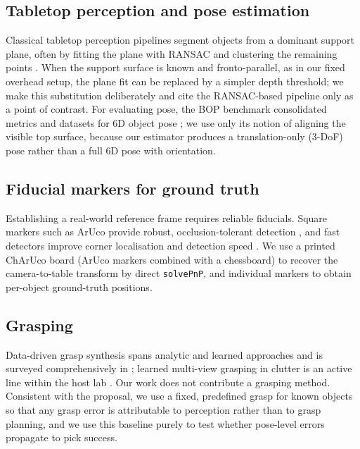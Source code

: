 \subsection{Tabletop perception and pose estimation}
Classical tabletop perception pipelines segment objects from a dominant support plane,
often by fitting the plane with RANSAC and clustering the remaining points
\cite{rusu2008towards}. When the support surface is known and fronto-parallel, as in our
fixed overhead setup, the plane fit can be replaced by a simpler depth threshold; we make
this substitution deliberately and cite the RANSAC-based pipeline only as a point of
contrast. For evaluating pose, the BOP benchmark consolidated metrics and datasets for 6D
object pose \cite{hodan2018bop}; we use only its notion of aligning the visible top
surface, because our estimator produces a translation-only (3-DoF) pose rather than a
full 6D pose with orientation.

\subsection{Fiducial markers for ground truth}
Establishing a real-world reference frame requires reliable fiducials. Square markers such
as ArUco provide robust, occlusion-tolerant detection \cite{garridojurado2014aruco}, and
fast detectors improve corner localisation and detection speed
\cite{romeroramirez2018charuco}. We use a printed ChArUco board (ArUco markers combined
with a chessboard) to recover the camera-to-table transform by direct \texttt{solvePnP},
and individual markers to obtain per-object ground-truth positions.

\subsection{Grasping}
Data-driven grasp synthesis spans analytic and learned approaches and is surveyed
comprehensively in ; learned multi-view grasping in clutter is an
active line within the host lab \cite{kasaei2021mvgrasp}. Our work does not contribute a
grasping method. Consistent with the proposal, we use a fixed, predefined grasp for known
objects so that any grasp error is attributable to perception rather than to grasp
planning, and we use this baseline purely to test whether pose-level errors propagate to
pick success.

